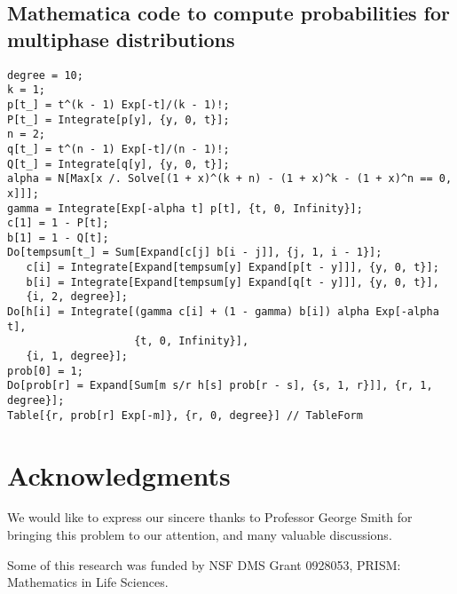 \documentclass[12pt]{amsart}
\theoremstyle{plain}
\theoremstyle{definition}
\theoremstyle{remark}
\theoremstyle{definition}
\begin{document}
\subsection{Mathematica code to compute probabilities for multiphase distributions}

\begin{verbatim}
degree = 10;
k = 1;
p[t_] = t^(k - 1) Exp[-t]/(k - 1)!;
P[t_] = Integrate[p[y], {y, 0, t}];
n = 2;
q[t_] = t^(n - 1) Exp[-t]/(n - 1)!;
Q[t_] = Integrate[q[y], {y, 0, t}];
alpha = N[Max[x /. Solve[(1 + x)^(k + n) - (1 + x)^k - (1 + x)^n == 0, x]]];
gamma = Integrate[Exp[-alpha t] p[t], {t, 0, Infinity}];
c[1] = 1 - P[t];
b[1] = 1 - Q[t];
Do[tempsum[t_] = Sum[Expand[c[j] b[i - j]], {j, 1, i - 1}];
   c[i] = Integrate[Expand[tempsum[y] Expand[p[t - y]]], {y, 0, t}]; 
   b[i] = Integrate[Expand[tempsum[y] Expand[q[t - y]]], {y, 0, t}],
   {i, 2, degree}];
Do[h[i] = Integrate[(gamma c[i] + (1 - gamma) b[i]) alpha Exp[-alpha t],
                    {t, 0, Infinity}],
   {i, 1, degree}];
prob[0] = 1;
Do[prob[r] = Expand[Sum[m s/r h[s] prob[r - s], {s, 1, r}]], {r, 1, degree}];
Table[{r, prob[r] Exp[-m]}, {r, 0, degree}] // TableForm
\end{verbatim}

\section*{Acknowledgments}

We would like to express our sincere thanks to Professor George Smith for bringing this problem to our attention, and many valuable discussions.

Some of this research was funded by NSF DMS Grant 0928053, PRISM: Mathematics in Life Sciences.



\nocite{*}

\end{document}
